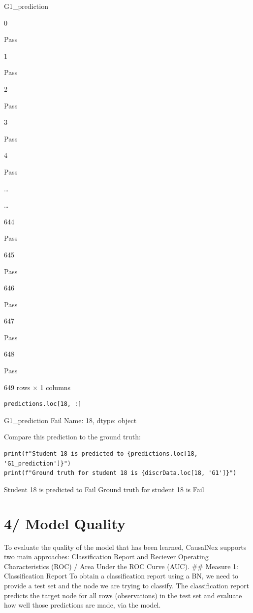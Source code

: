 \documentclass[
]{article}
\begin{document}
G1\_prediction

0

Pass

1

Pass

2

Pass

3

Pass

4

Pass

\ldots{}

\ldots{}

644

Pass

645

Pass

646

Pass

647

Pass

648

Pass

649 rows × 1 columns

\begin{verbatim}
predictions.loc[18, :]
\end{verbatim}

G1\_prediction Fail Name: 18, dtype: object

Compare this prediction to the ground truth:

\begin{verbatim}
print(f"Student 18 is predicted to {predictions.loc[18, 'G1_prediction']}")
print(f"Ground truth for student 18 is {discrData.loc[18, 'G1']}")
\end{verbatim}

Student 18 is predicted to Fail Ground truth for student 18 is Fail

\hypertarget{model-quality}{%
\section{4/ Model Quality}\label{model-quality}}

To evaluate the quality of the model that has been learned, CausalNex
supports two main approaches: Classification Report and Reciever
Operating Characteristics (ROC) / Area Under the ROC Curve (AUC). \#\#
Measure 1: Classification Report To obtain a classification report using
a BN, we need to provide a test set and the node we are trying to
classify. The classification report predicts the target node for all
rows (observations) in the test set and evaluate how well those
predictions are made, via the model.
\end{document}
